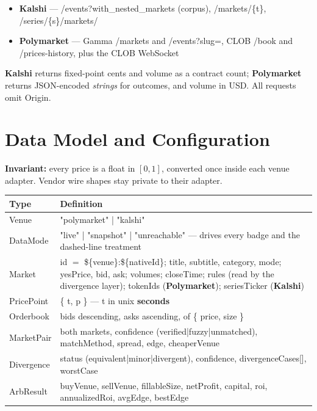 \documentclass[11pt,a4paper]{article}
\newcommand{\code}[1]{{\ttfamily\small #1}}
\newcommand{\PM}{{\color{poly}\textbf{Polymarket}}}
\newcommand{\KS}{{\color{kalshi}\textbf{Kalshi}}}
\begin{document}
\begin{itemize}
  \item \KS{} --- \code{/events?with\_\allowbreak nested\_markets} (corpus),
        \code{/markets/\{t\}}\allowbreak\code{[/orderbook]},
        \code{/series/\{s\}/markets/}\allowbreak\code{\{t\}/candlesticks}
  \item \PM{} --- Gamma \code{/markets} and \code{/events?slug=}, CLOB \code{/book} and
        \code{/prices-history}, plus the CLOB WebSocket
\end{itemize}

\KS{} returns fixed-point cents and volume as a contract count; \PM{} returns JSON-encoded
\emph{strings} for outcomes, and volume in USD. All requests omit \code{Origin}.

\section{Data Model and Configuration}

\textbf{Invariant:} every price is a float in $[0,1]$, converted once inside each venue
adapter. Vendor wire shapes stay private to their adapter.

\begin{table}[htbp]
\centering\small
\begin{tabularx}{\textwidth}{@{}p{2.9cm}X@{}}
\toprule
\textbf{Type} & \textbf{Definition} \\
\midrule
\code{Venue} & \code{"polymarket" | "kalshi"} \\
\code{DataMode} & \code{"live" | "snapshot" | "unreachable"} --- drives every badge and the
  dashed-line treatment \\
\code{Market} & \code{id} $=$ \code{\$\{venue\}:\$\{nativeId\}}; title, subtitle, category, mode;
  \code{yesPrice}, \code{bid}, \code{ask}; volumes; \code{closeTime}; \code{rules} (read by the
  divergence layer); \code{tokenIds} (\PM{}); \code{seriesTicker} (\KS{}) \\
\code{PricePoint} & \code{\{ t, p \}} --- \code{t} in unix \textbf{seconds} \\
\code{Orderbook} & \code{bids} descending, \code{asks} ascending, of \code{\{ price, size \}} \\
\code{MarketPair} & both markets, \code{confidence} (\code{verified|fuzzy|unmatched}),
  \code{matchMethod}, \code{spread}, \code{edge}, \code{cheaperVenue} \\
\code{Divergence} & \code{status} (\code{equivalent|minor|divergent}), \code{confidence},
  \code{divergenceCases[]}, \code{worstCase} \\
\code{ArbResult} & \code{buyVenue}, \code{sellVenue}, \code{fillableSize}, \code{netProfit},
  \code{capital}, \code{roi}, \code{annualizedRoi}, \code{avgEdge}, \code{bestEdge} \\
\bottomrule
\end{tabularx}
\end{table}
\end{document}
